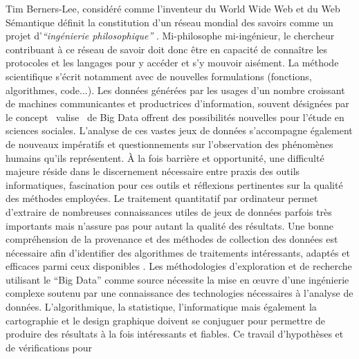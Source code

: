 Tim Berners-Lee, consid\'er\'e comme l{\textquoteright}inventeur du
World Wide Web et du Web S\'emantique d\'efinit la constitution
d{\textquoteright}un r\'eseau mondial des savoirs comme un projet
d{\textquoteright}\textit{{\textquotedblleft}ing\'enierie
philosophique{\textquotedblright} }\cite{Halpin2014}.
Mi-philosophe mi-ing\'enieur, le chercheur contribuant \`a ce r\'eseau
de savoir doit donc \^etre en capacit\'e de conna\^itre les protocoles
et les langages pour y acc\'eder et s{\textquoteright}y mouvoir
ais\'ement. La m\'ethode scientifique s{\textquoteright}\'ecrit
notamment avec de nouvelles formulations (fonctions, algorithmes,
code...). Les donn\'ees g\'en\'er\'ees par les usages
d{\textquoteright}un nombre croissant de machines communicantes et
productrices d{\textquoteright}information, souvent d\'esign\'ees par
le concept {\guillemotleft}~valise~{\guillemotright} de Big Data \cite{Lohr2012} offrent des possibilit\'es nouvelles pour
l{\textquoteright}\'etude en sciences sociales.
L{\textquoteright}analyse de ces vastes jeux de donn\'ees
s{\textquoteright}accompagne \'egalement de nouveaux imp\'eratifs et
questionnements sur l{\textquoteright}observation des ph\'enom\`enes
humains qu{\textquoteright}ils repr\'esentent. \`A la fois barri\`ere
et opportunit\'e, une difficult\'e majeure r\'eside dans le
discernement n\'ecessaire entre praxis des outils informatiques,
fascination pour ces outils et r\'eflexions pertinentes sur la
qualit\'e des m\'ethodes employ\'ees. Le traitement quantitatif par
ordinateur permet d{\textquoteright}extraire de nombreuses
connaissances utiles de jeux de donn\'ees parfois tr\`es importants
mais n{\textquoteright}assure pas pour autant la qualit\'e des
r\'esultats. Une bonne compr\'ehension de la provenance et des
m\'ethodes de collection des donn\'ees est n\'ecessaire afin
d{\textquoteright}identifier des algorithmes de traitements
int\'eressants, adapt\'es et efficaces parmi ceux disponibles
\cite{Rajaraman2011}. Les m\'ethodologies
d{\textquoteright}exploration et de recherche utilisant le
{\textquotedblleft}Big Data{\textquotedblright} comme source
n\'ecessite la mise en {\oe}uvre d{\textquoteright}une ing\'enierie
complexe soutenu par une connaissance des technologies n\'ecessaires
\`a l{\textquoteright}analyse de donn\'ees.
L{\textquoteright}algorithmique, la statistique,
l{\textquoteright}informatique mais \'egalement la cartographie et le
design graphique doivent se conjuguer pour permettre de produire des
r\'esultats \`a la fois int\'eressants et fiables. Ce travail
d{\textquoteright}hypoth\`eses et de v\'erifications pour
